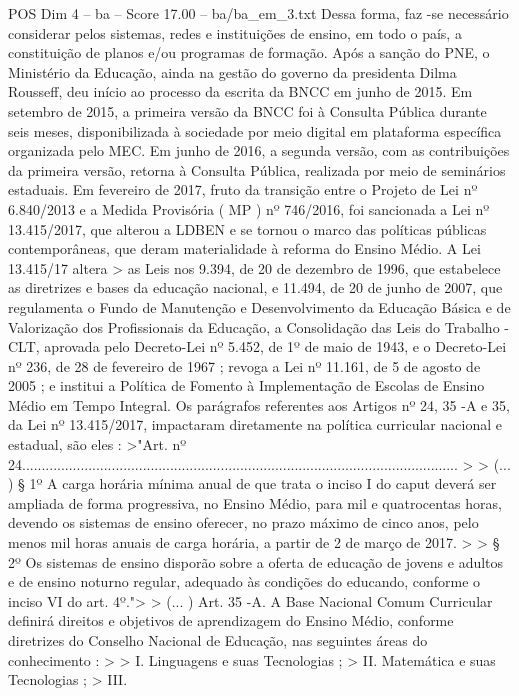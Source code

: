 \begin{textsample}{POS Dim 4 – ba – Score 17.00 – ba/ba\_em\_3.txt}
Dessa forma, faz -se necessário considerar pelos sistemas, redes e instituições de ensino, em todo o país, a constituição de planos e/ou programas de formação.
Após a sanção do PNE, o Ministério da Educação, ainda na gestão do governo da presidenta Dilma Rousseff, deu início ao processo da escrita da BNCC em junho de 2015.
Em setembro de 2015, a primeira versão da BNCC foi à Consulta Pública durante seis meses, disponibilizada à sociedade por meio digital em plataforma específica organizada pelo MEC.
Em junho de 2016, a segunda versão, com as contribuições da primeira versão, retorna à Consulta Pública, realizada por meio de seminários estaduais.
Em fevereiro de 2017, fruto da transição entre o Projeto de Lei nº 6.840/2013 e a Medida Provisória ( MP ) nº 746/2016, foi sancionada a Lei nº 13.415/2017, que alterou a LDBEN e se tornou o marco das políticas públicas contemporâneas, que deram materialidade à reforma do Ensino Médio.
A Lei 13.415/17 altera > as Leis nos 9.394, de 20 de dezembro de 1996, que estabelece as diretrizes e bases da educação nacional, e 11.494, de 20 de junho de 2007, que regulamenta o Fundo de Manutenção e Desenvolvimento da Educação Básica e de Valorização dos Profissionais da Educação, a Consolidação das Leis do Trabalho - CLT, aprovada pelo Decreto-Lei nº 5.452, de 1º de maio de 1943, e o Decreto-Lei nº 236, de 28 de fevereiro de 1967 ; revoga a Lei nº 11.161, de 5 de agosto de 2005 ; e institui a Política de Fomento à Implementação de Escolas de Ensino Médio em Tempo Integral.
Os parágrafos referentes aos Artigos nº 24, 35 -A e 35, da Lei nº 13.415/2017, impactaram diretamente na política curricular nacional e estadual, são eles : >"Art. nº 24................................................................................................................ > > (... ) § 1º A carga horária mínima anual de que trata o inciso I do caput deverá ser ampliada de forma progressiva, no Ensino Médio, para mil e quatrocentas horas, devendo os sistemas de ensino oferecer, no prazo máximo de cinco anos, pelo menos mil horas anuais de carga horária, a partir de 2 de março de 2017. > > § 2º Os sistemas de ensino disporão sobre a oferta de educação de jovens e adultos e de ensino noturno regular, adequado às condições do educando, conforme o inciso VI do art. 4º."> > (... ) Art. 35 -A.
A Base Nacional Comum Curricular definirá direitos e objetivos de aprendizagem do Ensino Médio, conforme diretrizes do Conselho Nacional de Educação, nas seguintes áreas do conhecimento : > > I.
Linguagens e suas Tecnologias ; > II.
Matemática e suas Tecnologias ; > III.

\end{textsample}
